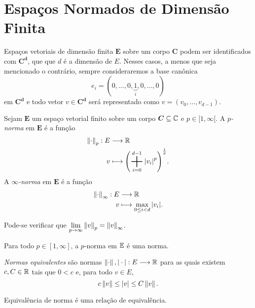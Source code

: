 \section{Espaços Normados de Dimensão Finita}

Espaços vetoriais de dimensão finita $\bm E$ sobre um corpo $\bm C$ podem ser identificados com $\bm{C^d}$, que que $d$ é a dimensão de $E$. Nesses casos, a menos que seja mencionado o contrário, sempre consideraremos a base canônica
	\begin{equation*}
	e_i = (0,\dots,0,\underbrace{1}_i,0,\dots,0)
	\end{equation*}
em $\bm{C^d}$ e todo vetor $v \in \bm{C^d}$ será representado como $v=(v_0,\dots,v_{d-1})$.

\begin{defi}
Sejam $\bm E$ um espaço vetorial finito sobre um corpo $\bm C \subseteq \mathbb{C}$ e $p \in [1,\infty[$. A \emph{$p$-norma} em $\bm E$ é a função
	\begin{align*}
	\func{\nor{\cdot}_p}{E}{\R}{v}{\left(\bigplus_{i=0}^{d-1}\abs{v_i}^p\right)^{\frac{1}{p}}}.
	\end{align*}
A \emph{$\infty$-norma} em $\bm E$ é a função
	\begin{align*}
	{\left\Vert{\cdot}\right\Vert_\infty}: {E} &\longrightarrow {\mathbb{R}} \\{v} &\longmapsto {\max_{0 \leq i < d} \left\vert{v_i}\right\vert}.
	\end{align*}
\end{defi}

Pode-se verificar que $\displaystyle\lim_{p \rightarrow \infty} \left\Vert{v}\right\Vert_p = \left\Vert{v}\right\Vert_\infty$.

\begin{prop}
Para todo $p \in [1,\infty]$, a $p$-norma em $\mathbb{E}$ é uma norma.
\end{prop}

\begin{defi}
\emph{Normas equivalentes} são normas $\left\Vert{\cdot}\right\Vert, |\cdot|: E \longrightarrow \mathbb{R}$ para as quais existem $c,C \in \mathbb{R}$ tais que $0 < c$ e, para todo $v \in E$,
	\begin{equation*}
	c \left\Vert{v}\right\Vert \leq |v| \leq C \left\Vert{v}\right\Vert.
	\end{equation*}
\end{defi}

\begin{prop}
Equivalência de norma é uma relação de equivalência.
\end{prop}

